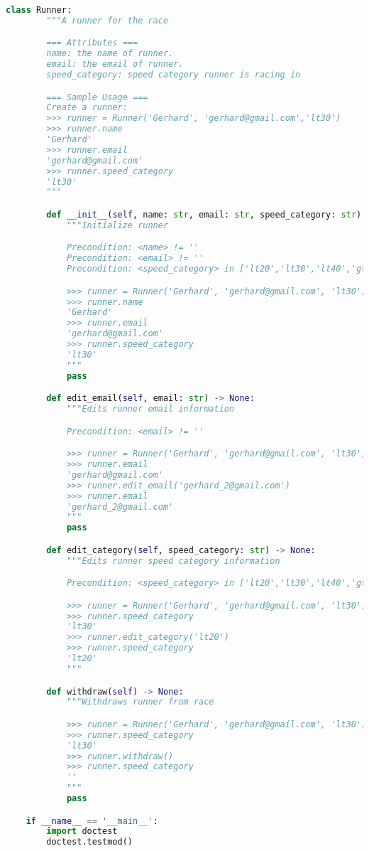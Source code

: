 \documentclass[12pt]{article}
\begin{document}
\begin{enumerate}[1.]
\begin{lstlisting}[language=Python]
    class Runner:
        """A runner for the race

        === Attributes ===
        name: the name of runner.
        email: the email of runner.
        speed_category: speed category runner is racing in

        === Sample Usage ===
        Create a runner:
        >>> runner = Runner('Gerhard', 'gerhard@gmail.com','lt30')
        >>> runner.name
        'Gerhard'
        >>> runner.email
        'gerhard@gmail.com'
        >>> runner.speed_category
        'lt30'
        """

        def __init__(self, name: str, email: str, speed_category: str) -> None:
            """Initialize runner

            Precondition: <name> != ''
            Precondition: <email> != ''
            Precondition: <speed_category> in ['lt20','lt30','lt40','gt40','']

            >>> runner = Runner('Gerhard', 'gerhard@gmail.com', 'lt30')
            >>> runner.name
            'Gerhard'
            >>> runner.email
            'gerhard@gmail.com'
            >>> runner.speed_category
            'lt30'
            """
            pass

        def edit_email(self, email: str) -> None:
            """Edits runner email information

            Precondition: <email> != ''

            >>> runner = Runner('Gerhard', 'gerhard@gmail.com', 'lt30')
            >>> runner.email
            'gerhard@gmail.com'
            >>> runner.edit_email('gerhard_2@gmail.com')
            >>> runner.email
            'gerhard_2@gmail.com'
            """
            pass

        def edit_category(self, speed_category: str) -> None:
            """Edits runner speed category information

            Precondition: <speed_category> in ['lt20','lt30','lt40','gt40']

            >>> runner = Runner('Gerhard', 'gerhard@gmail.com', 'lt30')
            >>> runner.speed_category
            'lt30'
            >>> runner.edit_category('lt20')
            >>> runner.speed_category
            'lt20'
            """

        def withdraw(self) -> None:
            """Withdraws runner from race

            >>> runner = Runner('Gerhard', 'gerhard@gmail.com', 'lt30')
            >>> runner.speed_category
            'lt30'
            >>> runner.withdraw()
            >>> runner.speed_category
            ''
            """
            pass

    if __name__ == '__main__':
        import doctest
        doctest.testmod()

\end{lstlisting}


\end{enumerate}
\end{document}
